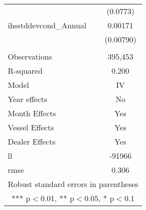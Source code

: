 \begin{tabular}{lc}
 & (0.0773) \\
ihsstddevcond\_Annual & 0.00171 \\
 & (0.00790) \\
 &  \\
Observations & 395,453 \\
R-squared & 0.200 \\
Model & IV \\
Year effects & No \\
Month Effects & Yes \\
Vessel Effects & Yes \\
Dealer Effects & Yes \\
ll & -91966 \\
 rmse & 0.306 \\ \hline
\multicolumn{2}{c}{ Robust standard errors in parentheses} \\
\multicolumn{2}{c}{ *** p$<$0.01, ** p$<$0.05, * p$<$0.1} \\
\end{tabular}
